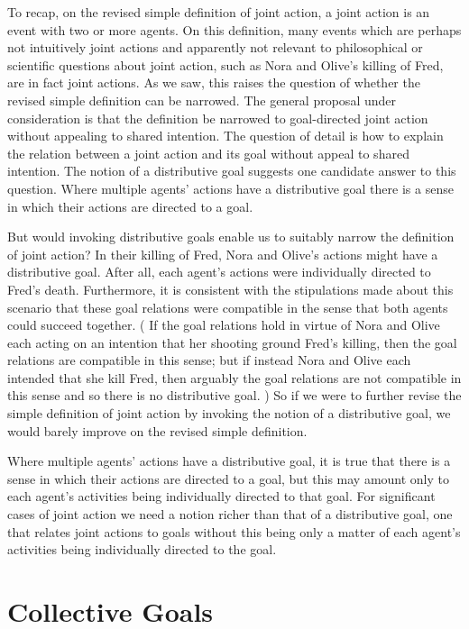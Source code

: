 \documentclass[12pt,a4paper]{extarticle}
\begin{document}
To recap, on the revised simple definition of joint action, a joint action is an event with two or more agents.
On this definition, many events which are perhaps not intuitively joint actions and apparently not relevant to philosophical or scientific questions about joint action, such as Nora and Olive's killing of Fred, are in fact joint actions.
As we saw, this raises the question of whether the revised simple definition can be narrowed. 
The general proposal under consideration is that the definition be narrowed to goal-directed joint action without appealing to shared intention.
The question of detail is how to explain the relation between a joint action and its goal without appeal to shared intention.
The notion of a distributive goal suggests one candidate answer to this question.
Where multiple agents' actions have a distributive goal there is a sense in which their actions are directed to a goal.  

But would invoking distributive goals enable us to suitably narrow the definition of joint action?
In their killing of Fred, Nora and Olive's actions might have a distributive goal.
After all, each agent's actions were individually directed to Fred's death.
Furthermore, it is consistent with the stipulations made about this scenario that these goal relations were compatible in the sense that both agents could succeed together.
(%
If the goal relations hold in virtue of Nora and Olive each acting on an intention that her shooting ground Fred's killing, then the goal relations are compatible in this sense; but if instead Nora and Olive each intended that she kill Fred, then arguably the goal relations are not compatible in this sense and so there is no distributive goal.%
)
So if we were to further revise the simple definition of joint action by invoking the notion of a distributive goal, we would barely improve on the revised simple definition.

Where multiple agents' actions have a distributive goal, it is true that there is a sense in which their actions are directed to a goal, 
but this may amount only to each agent's activities being individually directed to that goal.  
For significant cases of joint action we need a notion richer than that of a distributive goal, one that relates joint actions to goals without this being only a matter of each agent's activities being individually directed to the goal.





\section{Collective Goals}
\label{section_collective}
\end{document}
